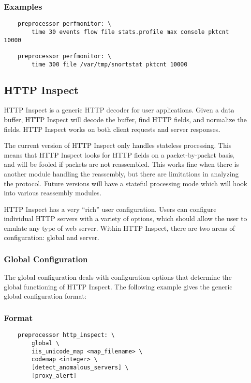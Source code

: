 \documentclass[english]{report}
\begin{document}
\subsubsection{Examples}

\begin{verbatim}
    preprocessor perfmonitor: \
        time 30 events flow file stats.profile max console pktcnt 10000 

    preprocessor perfmonitor: \
        time 300 file /var/tmp/snortstat pktcnt 10000
\end{verbatim}

\subsection{HTTP Inspect}
\label{sub:http-inspect}

HTTP Inspect is a generic HTTP decoder for user applications.  Given a data
buffer, HTTP Inspect will decode the buffer, find HTTP fields, and normalize
the fields.  HTTP Inspect works on both client requests and server responses.

The current version of HTTP Inspect only handles stateless processing.  This
means that HTTP Inspect looks for HTTP fields on a packet-by-packet basis, and
will be fooled if packets are not reassembled.  This works fine when there is
another module handling the reassembly, but there are limitations in analyzing
the protocol.  Future versions will have a stateful processing mode which will
hook into various reassembly modules.

HTTP Inspect has a very ``rich'' user configuration.  Users can configure
individual HTTP servers with a variety of options, which should allow the user
to emulate any type of web server. Within HTTP Inspect, there are two areas of
configuration: global and server.

\subsubsection{Global Configuration}

The global configuration deals with configuration options that determine the
global functioning of HTTP Inspect.  The following example gives the generic
global configuration format:

\subsubsection{Format}
\begin{verbatim}
    preprocessor http_inspect: \
        global \
        iis_unicode_map <map_filename> \
        codemap <integer> \
        [detect_anomalous_servers] \
        [proxy_alert]
\end{verbatim}
\end{document}
